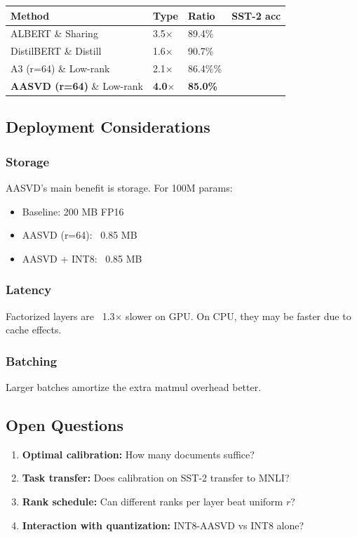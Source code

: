 \begin{table}[H]
\centering
\small
\begin{tabular}{llll}
\toprule
\textbf{Method} & \textbf{Type} & \textbf{Ratio} & \textbf{SST-2 acc} \\
\midrule
ALBERT \& Sharing & 3.5$\times$ & 89.4\% \\
DistilBERT \& Distill & 1.6$\times$ & 90.7\% \\
A3 (r=64) \& Low-rank & 2.1$\times$ & 86.4\%\% \\
\textbf{AASVD (r=64)} \& Low-rank & \textbf{4.0$\times$} & \textbf{85.0\%} \\
\bottomrule
\end{tabular}
\end{table}

\subsection{Deployment Considerations}

\subsubsection{Storage}

AASVD's main benefit is storage. For 100M params:
\begin{itemize}
\item Baseline: 200 MB FP16
\item AASVD (r=64): ~0.85 MB
\item AASVD + INT8: ~0.85 MB

\end{itemize}
\subsubsection{Latency}

Factorized layers are ~1.3$\times$ slower on GPU. On CPU, they may 
be faster due to cache effects.

\subsubsection{Batching}

Larger batches amortize the extra matmul overhead better.

\subsection{Open Questions}

\begin{enumerate}
\item \textbf{Optimal calibration:} How many documents suffice?
\item \textbf{Task transfer:} Does calibration on SST-2 transfer to MNLI?
\item \textbf{Rank schedule:} Can different ranks per layer beat uniform $r$?
\item \textbf{Interaction with quantization:} INT8-AASVD vs INT8 alone?

\end{enumerate}
